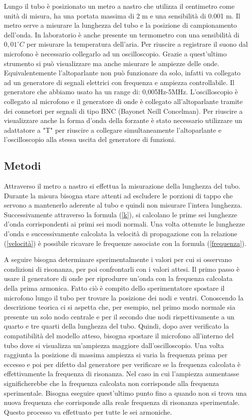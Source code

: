 \documentclass[11pt]{article}
\begin{document}
Lungo il tubo è posizionato un metro a nastro che utilizza il centimetro come unità di misura, ha una portata massima di 2 m e una sensibilità di 0.001 m. Il metro serve a misurare la lunghezza del tubo e la posizione di campionamento dell'onda.
In laboratorio è anche presente un termometro con una sensibilità di $0,01^{\circ}C$ per misurare la temperatura dell'aria.
Per riuscire a registrare il suono dal microfono è necessario collegarlo ad un oscilloscopio. Grazie a quest'ultimo strumento si può visualizzare ma anche misurare le ampiezze delle onde.
Equivalentemente l'altoparlante non può funzionare da solo, infatti va collegato ad un generatore di segnali elettrici con frequenza e ampiezza controllabile. Il generatore che abbiamo usato ha un range di: 0,005Hz-5MHz.
L'oscilloscopio è collegato al microfono e il generatore di onde è collegato all'altoparlante tramite dei connetori per segnali di tipo BNC (Bayonet Neill Concelman). 
Per riuscire a visualizzare anche la forma d'onda della forzante è stato necessario utilizzare un adattatore a "T" per riuscire a collegare simultaneamente l'altoparlante e l'oscilloscopio alla stessa uscita del generatore di funzioni.
\subsection{Metodi}
Attraverso il metro a nastro si effettua la misurazione della lunghezza del tubo. Durante la misura bisogna stare attenti ad escludere le porzioni di tappo che servono a mantenerlo aderente al tubo e quindi non misurare l'intera lunghezza. Successivamente attraverso la formula (\ref{k}), si calcolano le prime sei lunghezze d'onda corrispondenti ai primi sei modi normali. Una volta ottenute le lunghezze d'onda e successivamente calcolata la velocità di propagazione con la relazione (\ref{velocità}) è possibile ricavare le frequenze associate con la formula (\ref{frequenza}).

A seguire bisogna determinare sperimentalmente i valori per cui si osservano condizioni di risonanza, per poi confrontarli con i valori attesi. Il primo passo è usare il generatore di onde per riprodurre un'onda con la frequenza calcolata della prima armonica. Fatto ciò è compito dello sperimentatore spostare il microfono lungo il tubo per trovare la posizione dei nodi e ventri. Conoscendo la descrizione teorica ci si aspetta che, per esempio, nel primo modo normale sia presente un solo nodo centrale e per il secondo due nodi rispettivamente a un quarto e  tre quarti della lunghezza del tubo. Quindi, dopo aver verificato la compatibilità del modello atteso, bisogna spostare il microfono all'interno del tubo dove si visualizza un'ampiezza maggiore dall'oscilloscopio. Una volta raggiunta la posizione di massima ampiezza si varia la frequenza prima per eccesso e poi per difetto dal generatore per verificare se la frequenza calcolata è effettivamente la frequenza di risonanza. Nel caso in cui l'ampiezza aumentasse significherebbe che la frequenza calcolata non corrisponde alla frequenza sperimentale. Bisogna eseguire quest'ultimo punto fino a quando non si trova una nuova frequenza che corrisponde alla reale frequenza di risonanza sperimentale. Questo processo va effettuato per tutte le sei armoniche.
\end{document}
